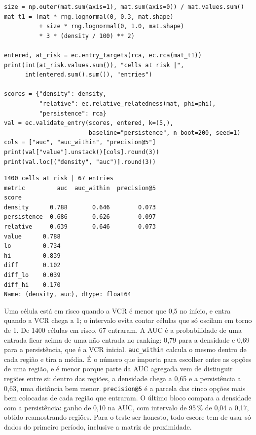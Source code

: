 \begin{lstlisting}
size = np.outer(mat.sum(axis=1), mat.sum(axis=0)) / mat.values.sum()
mat_t1 = (mat * rng.lognormal(0, 0.3, mat.shape)
          + size * rng.lognormal(0, 1.0, mat.shape)
          * 3 * (density / 100) ** 2)

entered, at_risk = ec.entry_targets(rca, ec.rca(mat_t1))
print(int(at_risk.values.sum()), "cells at risk |",
      int(entered.sum().sum()), "entries")

scores = {"density": density,
          "relative": ec.relative_relatedness(mat, phi=phi),
          "persistence": rca}
val = ec.validate_entry(scores, entered, k=(5,),
                        baseline="persistence", n_boot=200, seed=1)
cols = ["auc", "auc_within", "precision@5"]
print(val["value"].unstack()[cols].round(3))
print(val.loc[("density", "auc")].round(3))
\end{lstlisting}
\begin{lstlisting}[language={}, numbers=none, backgroundcolor=\color{white}, frame=leftline, framerule=2pt, rulecolor=\color{noteborder}, xleftmargin=1.5em]
1400 cells at risk | 67 entries
metric         auc  auc_within  precision@5
score                                      
density      0.788       0.646        0.073
persistence  0.686       0.626        0.097
relative     0.639       0.646        0.073
value      0.788
lo         0.734
hi         0.839
diff       0.102
diff_lo    0.039
diff_hi    0.170
Name: (density, auc), dtype: float64
\end{lstlisting}

Uma célula está em risco quando a VCR é menor que 0,5 no início,
e entra quando a VCR chega a 1; o intervalo evita contar células que só
oscilam em torno de 1. De 1400 células em risco,
67 entraram. A AUC é a probabilidade de uma
entrada ficar acima de uma não entrada no ranking:
0{,}79 para a densidade e
0{,}69 para a persistência, que é
a VCR inicial. \texttt{auc\_within} calcula o mesmo dentro de cada região
e tira a média. É o número que importa para escolher entre as opções de
uma região, e é menor porque parte da AUC agregada vem de distinguir
regiões entre si: dentro das regiões, a densidade chega a
0{,}65 e a persistência a
0{,}63, uma distância bem
menor. \texttt{precision@5} é a parcela das cinco opções mais
bem colocadas de cada região que entraram. O último bloco compara a
densidade com a persistência: ganho de
0{,}10 na AUC, com intervalo de 95\,\%
de 0{,}04 a
0{,}17, obtido reamostrando regiões.
Para o teste ser honesto, todo escore tem de usar só dados do primeiro
período, inclusive a matriz de proximidade.

